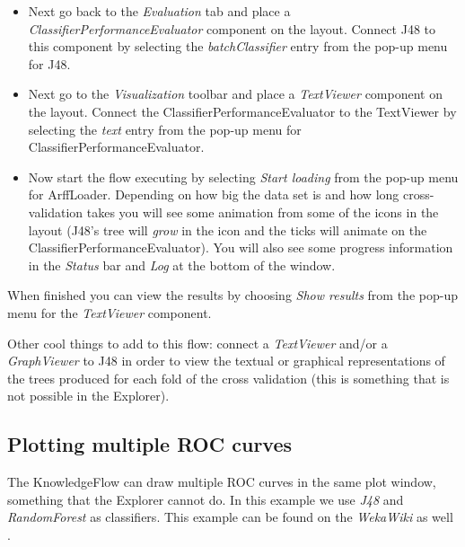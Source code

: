 \begin{itemize}
	\item Next go back to the \textit{Evaluation} tab and place a
	\textit{ClassifierPerformanceEvaluator} component on the layout. Connect J48
	to this component by selecting the \textit{batchClassifier} entry from the
	pop-up menu for J48.

	\item Next go to the \textit{Visualization} toolbar and place a \textit{TextViewer}
	component on the layout. Connect the ClassifierPerformanceEvaluator to
	the TextViewer by selecting the \textit{text} entry from the pop-up menu for
	ClassifierPerformanceEvaluator.

	\item Now start the flow executing by selecting \textit{Start loading} from the
	pop-up menu for ArffLoader. Depending on how big the data set is and
	how long cross-validation takes you will see some animation from some
	of the icons in the layout (J48's tree will \textit{grow} in the icon and the
	ticks will animate on the ClassifierPerformanceEvaluator). You will
	also see some progress information in the \textit{Status} bar and \textit{Log} at
	the bottom of the window.
\end{itemize}

When finished you can view the results by choosing \textit{Show results} from
the pop-up menu for the \textit{TextViewer} component.

Other cool things to add to this flow: connect a \textit{TextViewer} and/or a
\textit{GraphViewer} to J48 in order to view the textual or graphical
representations of the trees produced for each fold of the cross
validation (this is something that is not possible in the Explorer).


\newpage
\subsection{Plotting multiple ROC curves}
\label{exampleroc}
The KnowledgeFlow can draw multiple ROC curves in the same plot window, something that the 
Explorer cannot do. In this example we use \textit{J48} and \textit{RandomForest}
as classifiers. This example can be found on the \textit{WekaWiki} as well \cite{multipleroc}.

\begin{center}
\end{center}

